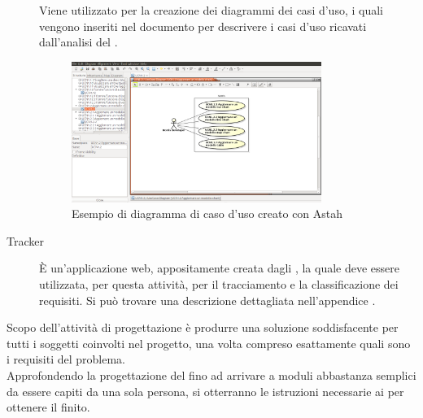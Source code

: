 			\begin{description}
				\item[] Viene utilizzato per la creazione dei diagrammi  dei casi d'uso, i quali vengono inseriti nel documento  per descrivere i casi d'uso ricavati dall'analisi del .
				\begin{figure}[H]
					\centering
					\includegraphics[width=0.8\textwidth]{NormeDiProgetto/Pics/CasoDusoAstah.png}
					\caption{Esempio di diagramma di caso d'uso creato con Astah}
				\end{figure}
				\item[Tracker] È un'applicazione web, appositamente creata dagli , la quale deve essere utilizzata, per questa attività, per il tracciamento e la classificazione dei requisiti. Si può trovare una descrizione dettagliata nell'appendice .
			\end{description}
		Scopo dell'attività di progettazione è produrre una soluzione soddisfacente per tutti i soggetti coinvolti nel progetto, una volta compreso esattamente quali sono i requisiti del problema. \\
		Approfondendo la progettazione del  fino ad arrivare a moduli abbastanza semplici da essere capiti da una sola persona, si otterranno le istruzioni necessarie ai  per ottenere il  finito.
			
